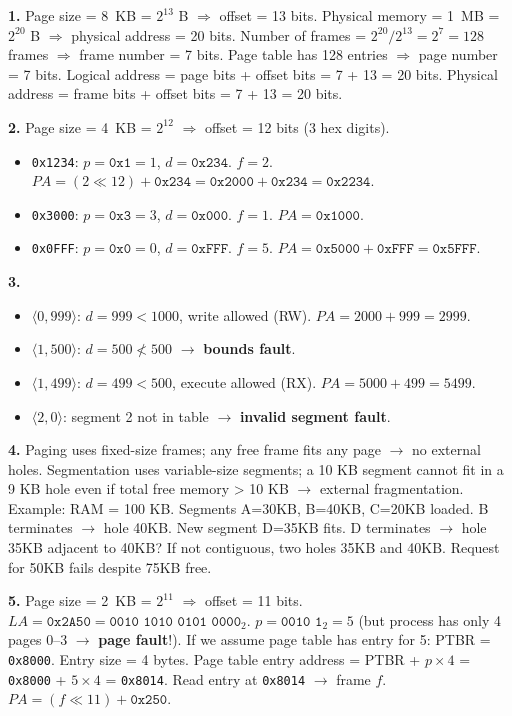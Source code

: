 \documentclass[11pt]{article}
\begin{document}
\begin{corrige}[Exercise 1]
\textbf{1.} Page size = \SI{8}{KB} = $2^{13}$ B $\Rightarrow$ offset = 13 bits.
Physical memory = \SI{1}{MB} = $2^{20}$ B $\Rightarrow$ physical address = 20 bits.
Number of frames = $2^{20} / 2^{13} = 2^7 = 128$ frames $\Rightarrow$ frame number = 7 bits.
Page table has 128 entries $\Rightarrow$ page number = 7 bits.
Logical address = page bits + offset bits = 7 + 13 = 20 bits.
Physical address = frame bits + offset bits = 7 + 13 = 20 bits.

\textbf{2.} Page size = \SI{4}{KB} = $2^{12}$ $\Rightarrow$ offset = 12 bits (3 hex digits).
\begin{itemize}
    \item \texttt{0x1234}: $p = \texttt{0x1} = 1$, $d = \texttt{0x234}$. $f=2$. $PA = (2 \ll 12) + \texttt{0x234} = \texttt{0x2000} + \texttt{0x234} = \texttt{0x2234}$.
    \item \texttt{0x3000}: $p = \texttt{0x3} = 3$, $d = \texttt{0x000}$. $f=1$. $PA = \texttt{0x1000}$.
    \item \texttt{0x0FFF}: $p = \texttt{0x0} = 0$, $d = \texttt{0xFFF}$. $f=5$. $PA = \texttt{0x5000} + \texttt{0xFFF} = \texttt{0x5FFF}$.
\end{itemize}

\textbf{3.}
\begin{itemize}
    \item $\langle 0, 999 \rangle$: $d=999 < 1000$, write allowed (RW). $PA = 2000+999 = 2999$.
    \item $\langle 1, 500 \rangle$: $d=500 \not< 500$ $\to$ \textbf{bounds fault}.
    \item $\langle 1, 499 \rangle$: $d=499 < 500$, execute allowed (RX). $PA = 5000+499 = 5499$.
    \item $\langle 2, 0 \rangle$: segment 2 not in table $\to$ \textbf{invalid segment fault}.
\end{itemize}

\textbf{4.} Paging uses fixed-size frames; any free frame fits any page $\to$ no external holes. Segmentation uses variable-size segments; a 10 KB segment cannot fit in a 9 KB hole even if total free memory > 10 KB $\to$ external fragmentation. Example: RAM = 100 KB. Segments A=30KB, B=40KB, C=20KB loaded. B terminates $\to$ hole 40KB. New segment D=35KB fits. D terminates $\to$ hole 35KB adjacent to 40KB? If not contiguous, two holes 35KB and 40KB. Request for 50KB fails despite 75KB free.

\textbf{5.} Page size = \SI{2}{KB} = $2^{11}$ $\Rightarrow$ offset = 11 bits.
$LA = \texttt{0x2A50} = \texttt{0010 1010 0101 0000}_2$.
$p = \texttt{0010 1}_2 = 5$ (but process has only 4 pages 0--3 $\to$ \textbf{page fault}!).
If we assume page table has entry for 5: PTBR = \texttt{0x8000}. Entry size = 4 bytes.
Page table entry address = PTBR + $p \times 4$ = \texttt{0x8000} + $5 \times 4$ = \texttt{0x8014}.
Read entry at \texttt{0x8014} $\to$ frame $f$. $PA = (f \ll 11) + \texttt{0x250}$.
\end{corrige}
\end{document}
